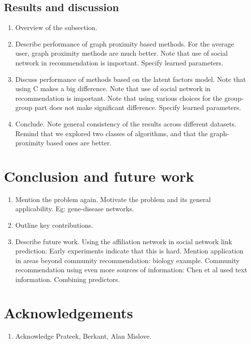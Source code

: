 \documentclass[11pt]{article}
\begin{document}
\subsection{Results and discussion}
\begin{enumerate}
 \item Overview of the subsection.
 
 \item Describe performance of graph proximity based methods.
  \subitem For the average user, graph proximity methods are much better.
  \subitem Note that use of social network in recommendation is important.
  \subitem Specify learned parameters.
 
 \item Discuss performance of methods based on the latent factors model.
  \subitem Note that using C makes a big difference. Note that use of social network in recommendation is important.
  \subitem Note that using various choices for the group-group part does not make significant difference.
  \subitem Specify learned parameters.
 
 \item Conclude.
  \subitem Note general consistency of the results across different datasets.
  \subitem Remind that we explored two classes of algorithms, and that the graph-proximity based ones are better.
\end{enumerate}

\section{Conclusion and future work}
\begin{enumerate}
 \item Mention the problem again.
  \subitem Motivate the problem and its general applicability. Eg: gene-disease networks.
 \item Outline key contributions.
 \item Describe future work.
  \subitem Using the affiliation network in social network link prediction: Early experiments indicate that this is hard.
  \subitem Mention application in areas beyond community recommendation: biology example.
  \subitem Community recommendation using even more sources of information: Chen et al used text information.
  \subitem Combining predictors.
\end{enumerate}


\section{Acknowledgements}
\begin{enumerate}
 \item Acknowledge Prateek, Berkant, Alan Mislove.
\end{enumerate}
\end{document}
